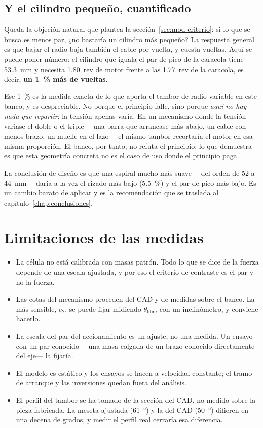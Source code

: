 \subsection{Y el cilindro pequeño, cuantificado}

Queda la objeción natural que plantea la sección~\ref{sec:mod-criterio}: si lo que se busca es menos
par, ¿no bastaría un cilindro más pequeño? La respuesta general es que bajar el radio baja también
el cable por vuelta, y cuesta vueltas. Aquí se puede poner número: el cilindro que iguala el par de
pico de la caracola tiene \SI{53.3}{\milli\metre} y necesita \SI{1.80}{rev} de motor frente a las
\SI{1.77}{rev} de la caracola, es decir, \textbf{un \SI{1}{\percent} más de vueltas}.

Ese \SI{1}{\percent} es la medida exacta de lo que aporta el tambor de radio variable en este banco,
y es despreciable. No porque el principio falle, sino porque \emph{aquí no hay nada que repartir}:
la tensión apenas varía. En un mecanismo donde la tensión variase el doble o el triple ---una barra
que arrancase más abajo, un cable con menos brazo, un muelle en el lazo--- el mismo tambor recortaría
el motor en esa misma proporción. El banco, por tanto, no refuta el principio: lo que demuestra es
que esta geometría concreta no es el caso de uso donde el principio paga.

La conclusión de diseño es que una espiral mucho más suave ---del orden de \num{52} a
\SI{44}{\milli\metre}--- daría a la vez el rizado más bajo (\SI{5.5}{\percent}) y el par de pico más
bajo. Es un cambio barato de aplicar y es la recomendación que se traslada al
capítulo~\ref{chap:conclusiones}.

\section{Limitaciones de las medidas}
\label{sec:res-limitaciones}

\begin{itemize}
  \item La célula no está calibrada con masas patrón. Todo lo que se dice de la fuerza depende de una
        escala ajustada, y por eso el criterio de contraste es el par y no la fuerza.
  \item Las cotas del mecanismo proceden del CAD y de medidas sobre el banco. La más sensible,
        $e_2$, se puede fijar midiendo $\theta_{\text{libre}}$ con un inclinómetro, y conviene
        hacerlo.
  \item La escala del par del accionamiento es un ajuste, no una medida. Un ensayo con un par
        conocido ---una masa colgada de un brazo conocido directamente del eje--- la fijaría.
  \item El modelo es estático y los ensayos se hacen a velocidad constante; el tramo de arranque y
        las inversiones quedan fuera del análisis.
  \item El perfil del tambor se ha tomado de la sección del CAD, no medido sobre la pieza
        fabricada. La meseta ajustada (\SI{61}{\degree}) y la del CAD (\SI{50}{\degree}) difieren en
        una decena de grados, y medir el perfil real cerraría esa diferencia.
\end{itemize}

